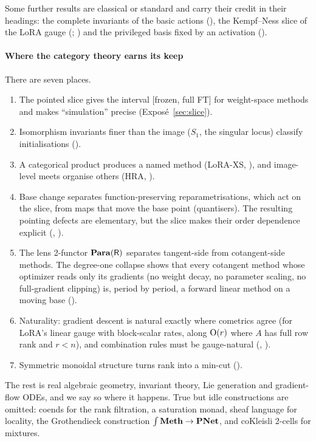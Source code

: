 Some further results are classical or standard and carry their credit in their headings: the complete invariants of the basic actions (), the Kempf--Ness slice of the LoRA gauge (; \citealp{xkempf1979length}) and the privileged basis fixed by an activation ().

\paragraph{Where the category theory earns its keep}
There are seven places.
\begin{enumerate}[label=\arabic*.]
\item The pointed slice gives the interval [frozen, full FT] for weight-space methods and makes ``simulation'' precise (Exposé~\ref{sec:slice}).
\item Isomorphism invariants finer than the image ($S_1$, the singular locus) classify initialisations ().
\item A categorical product produces a named method (LoRA-XS, ), and image-level meets organise others (HRA, ).
\item Base change separates function-preserving reparametrisations, which act on the slice, from maps that move the base point (quantisers). The resulting pointing defects are elementary, but the slice makes their order dependence explicit (, ).
\item The lens 2-functor $\mathbf{Para}(\mathsf R)$ separates tangent-side from cotangent-side methods. The degree-one collapse shows that every cotangent method whose optimizer reads only its gradients (no weight decay, no parameter scaling, no full-gradient clipping) is, period by period, a forward linear method on a moving base ().
\item Naturality: gradient descent is natural exactly where cometrics agree (for LoRA's linear gauge with block-scalar rates, along $\mathrm{O}(r)$ where $A$ has full row rank and $r<n$), and combination rules must be gauge-natural (, ).
\item Symmetric monoidal structure turns rank into a min-cut ().
\end{enumerate}
The rest is real algebraic geometry, invariant theory, Lie generation and gradient-flow ODEs, and we say so where it happens. True but idle constructions are omitted: coends for the rank filtration, a saturation monad, sheaf language for locality, the Grothendieck construction $\int\mathbf{Meth}\to\mathbf{PNet}$, and coKleisli 2-cells for mixtures.

